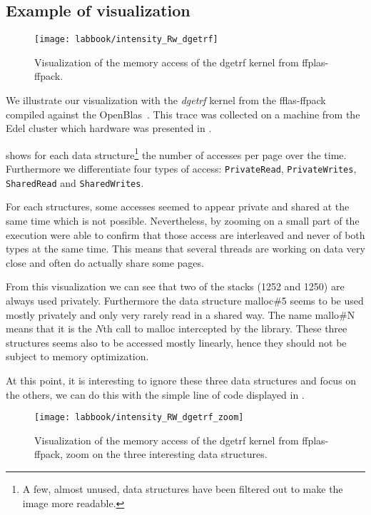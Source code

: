 \subsection{Example of visualization}

\begin{figure}[htb]
    \centering
    \texttt{[image: labbook/intensity\_Rw\_dgetrf]}
    \caption{Visualization of the memory access of the dgetrf kernel from ffplas-ffpack.}
    \label{fig:dgetrf-intensity}
\end{figure}

We illustrate our visualization with the \emph{dgetrf} kernel from the fflas-ffpack~\cite{group16FFLASFFPACK} compiled against the OpenBlas~\cite{Chothia16OpenBlas}.
This trace was collected on a machine from the Edel cluster which hardware was presented in .

 shows for each data structure\footnote{
    A few, almost unused, data structures have been filtered out to make the image more readable.}
    the number of accesses per page over the time.
Furthermore we differentiate four types of access: \texttt{PrivateRead}, \texttt{PrivateWrites}, \texttt{SharedRead} and \texttt{SharedWrites}.

For each structures, some accesses seemed to appear private and shared at the same time which is not possible.
Nevertheless, by zooming on a small part of the execution were able to confirm that those access are interleaved and never of both types at the same time.
This means that several threads are working on data very close and often do actually share some pages.

From this visualization we can see that two of the stacks (1252 and 1250) are always used privately.
Furthermore the data structure malloc\#5 seems to be used mostly privately and only very rarely read in a shared way.
The name mallo\#N means that it is the $N$th call to malloc intercepted by the library.
These three structures seems also to be accessed mostly linearly, hence they should not be subject to memory optimization.



At this point, it is interesting to ignore these three data structures and focus on the others, we can do this with the simple line of code displayed in .

\begin{figure}[htb]
    \centering
    \texttt{[image: labbook/intensity\_RW\_dgetrf\_zoom]}
    \caption{Visualization of the memory access of the dgetrf kernel from ffplas-ffpack, zoom on the three interesting data structures.}
    \label{fig:dgetrf-share-zoom}
\end{figure}

